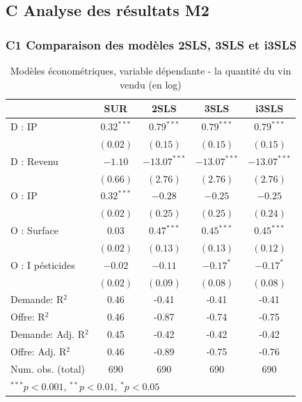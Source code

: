 \documentclass[11pt,]{article}
\begin{document}
\hypertarget{c-analyse-des-resultats-m2}{%
\subsection{C Analyse des résultats
M2}\label{c-analyse-des-resultats-m2}}

\hypertarget{c1-comparaison-des-modeles-2sls-3sls-et-i3sls}{%
\subsubsection{C1 Comparaison des modèles 2SLS, 3SLS et
i3SLS}\label{c1-comparaison-des-modeles-2sls-3sls-et-i3sls}}

\FloatBarrier

\begin{table}[!htbp]
\begin{center}
\begin{tabular}{l c c c c }
\hline
 & SUR & 2SLS & 3SLS & i3SLS \\
\hline
D : IP              & $0.32^{***}$ & $0.79^{***}$   & $0.79^{***}$   & $0.79^{***}$   \\
                    & $(0.02)$     & $(0.15)$       & $(0.15)$       & $(0.15)$       \\
D : Revenu          & $-1.10$      & $-13.07^{***}$ & $-13.07^{***}$ & $-13.07^{***}$ \\
                    & $(0.66)$     & $(2.76)$       & $(2.76)$       & $(2.76)$       \\
O : IP              & $0.32^{***}$ & $-0.28$        & $-0.25$        & $-0.25$        \\
                    & $(0.02)$     & $(0.25)$       & $(0.25)$       & $(0.24)$       \\
O : Surface         & $0.03$       & $0.47^{***}$   & $0.45^{***}$   & $0.45^{***}$   \\
                    & $(0.02)$     & $(0.13)$       & $(0.13)$       & $(0.12)$       \\
O : I pésticides    & $-0.02$      & $-0.11$        & $-0.17^{*}$    & $-0.17^{*}$    \\
                    & $(0.02)$     & $(0.09)$       & $(0.08)$       & $(0.08)$       \\
\hline
Demande: R$^2$      & 0.46         & -0.41          & -0.41          & -0.41          \\
Offre: R$^2$        & 0.46         & -0.87          & -0.74          & -0.75          \\
Demande: Adj. R$^2$ & 0.45         & -0.42          & -0.42          & -0.42          \\
Offre: Adj. R$^2$   & 0.46         & -0.89          & -0.75          & -0.76          \\
Num. obs. (total)   & 690          & 690            & 690            & 690            \\
\hline
\multicolumn{5}{l}{\scriptsize{$^{***}p<0.001$, $^{**}p<0.01$, $^*p<0.05$}}
\end{tabular}
\caption{Modèles économétriques, variable dépendante - la quantité du vin vendu (en log)}
\label{table : sur, 2sls, 3sls and fiml}
\end{center}
\end{table}
\end{document}
